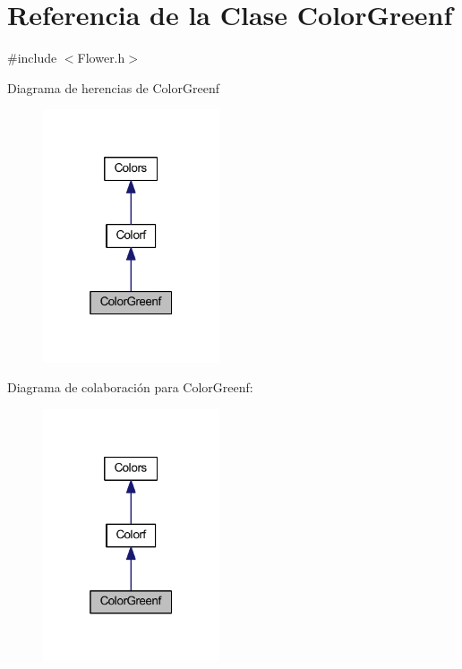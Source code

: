 \hypertarget{class_color_greenf}{}\section{Referencia de la Clase Color\+Greenf}
\label{class_color_greenf}


{\ttfamily \#include $<$Flower.\+h$>$}



Diagrama de herencias de Color\+Greenf
\nopagebreak
\begin{figure}[H]
\begin{center}
\leavevmode
\includegraphics[width=148pt]{class_color_greenf__inherit__graph}
\end{center}
\end{figure}


Diagrama de colaboración para Color\+Greenf\+:
\nopagebreak
\begin{figure}[H]
\begin{center}
\leavevmode
\includegraphics[width=148pt]{class_color_greenf__coll__graph}
\end{center}
\end{figure}
